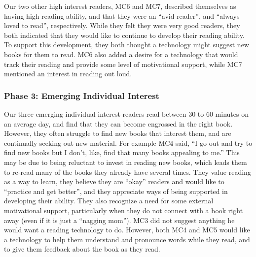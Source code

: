 \documentclass{sigchi}
\begin{document}
Our two other high interest readers, MC6 and MC7, described themselves as having high reading ability, and that they were an ``avid reader'', and ``always loved to read'', respectively. While they felt they were very good readers, they both indicated that they would like to continue to develop their reading ability. To support this development, they both thought a technology might suggest new books for them to read. MC6 also added a desire for a technology that would track their reading and provide some level of motivational support, while MC7 mentioned an interest in reading out loud.

\subsubsection{Phase 3: Emerging Individual Interest}
Our three emerging individual interest readers read between 30 to 60 minutes on an average day, and find that they can become engrossed in the right book. However, they often struggle to find new books that interest them, and are continually seeking out new material. For example MC4 said, ``I go out and try to find new books but I don't, like, find that many books appealing to me.'' This may be due to being reluctant to invest in reading new books, which leads them to re-read many of the books they already have several times. They value reading as a way to learn, they believe they are ``okay'' readers and would like to ``practice and get better'', and they appreciate ways of being supported in developing their ability. They also recognize a need for some external motivational support, particularly when they do not connect with a book right away (even if it is just a ``nagging mom''). MC3 did not suggest anything he would want a reading technology to do. However, both MC4 and MC5 would like a technology to help them understand and pronounce words while they read, and to give them feedback about the book as they read.
\end{document}
